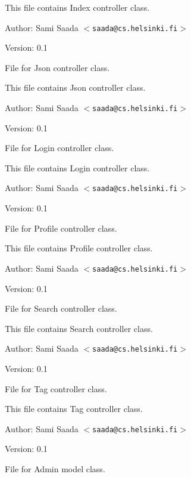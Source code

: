 This file contains Index controller class. \begin{Desc}
\item[Author:]Sami Saada $<${\tt saada@cs.helsinki.fi}$>$ \end{Desc}
\begin{Desc}
\item[Version:]0.1\end{Desc}
File for Json controller class.

This file contains Json controller class. \begin{Desc}
\item[Author:]Sami Saada $<${\tt saada@cs.helsinki.fi}$>$ \end{Desc}
\begin{Desc}
\item[Version:]0.1\end{Desc}
File for Login controller class.

This file contains Login controller class. \begin{Desc}
\item[Author:]Sami Saada $<${\tt saada@cs.helsinki.fi}$>$ \end{Desc}
\begin{Desc}
\item[Version:]0.1\end{Desc}
File for Profile controller class.

This file contains Profile controller class. \begin{Desc}
\item[Author:]Sami Saada $<${\tt saada@cs.helsinki.fi}$>$ \end{Desc}
\begin{Desc}
\item[Version:]0.1\end{Desc}
File for Search controller class.

This file contains Search controller class. \begin{Desc}
\item[Author:]Sami Saada $<${\tt saada@cs.helsinki.fi}$>$ \end{Desc}
\begin{Desc}
\item[Version:]0.1\end{Desc}
File for Tag controller class.

This file contains Tag controller class. \begin{Desc}
\item[Author:]Sami Saada $<${\tt saada@cs.helsinki.fi}$>$ \end{Desc}
\begin{Desc}
\item[Version:]0.1\end{Desc}
File for Admin model class.

